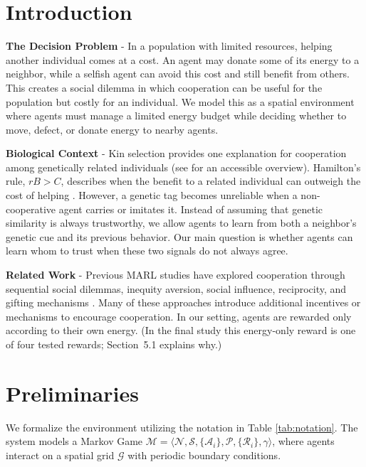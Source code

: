 \documentclass{article}
\begin{document}
\section{Introduction}

\textbf{The Decision Problem} - In a population with limited resources, helping another individual comes at a cost. An agent may donate some of its energy to a neighbor, while a selfish agent can avoid this cost and still benefit from others. This creates a social dilemma in which cooperation can be useful for the population but costly for an individual. We model this as a spatial environment where agents must manage a limited energy budget while deciding whether to move, defect, or donate energy to nearby agents.

\textbf{Biological Context} - Kin selection provides one explanation for cooperation among genetically related individuals (see \cite{veritasium2025} for an accessible overview). Hamilton's rule, $rB>C$, describes when the benefit to a related individual can outweigh the cost of helping \cite{hamilton1964}. However, a genetic tag becomes unreliable when a non-cooperative agent carries or imitates it. Instead of assuming that genetic similarity is always trustworthy, we allow agents to learn from both a neighbor's genetic cue and its previous behavior. Our main question is whether agents can learn whom to trust when these two signals do not always agree.

\textbf{Related Work} - Previous MARL studies have explored cooperation through sequential social dilemmas, inequity aversion, social influence, reciprocity, and gifting mechanisms \cite{leibo2017,hughes2018,jaques2019,eccles2019,lupu2020,perolat2017}. Many of these approaches introduce additional incentives or mechanisms to encourage cooperation. In our setting, agents are rewarded only according to their own energy. (In the final study this energy-only reward is one of four tested rewards; Section~5.1 explains why.)

\section{Preliminaries}

We formalize the environment utilizing the notation in Table \ref{tab:notation}. The system models a Markov Game $\mathcal{M} = \langle \mathcal{N}, \mathcal{S}, \{\mathcal{A}_i\}, \mathcal{P}, \{\mathcal{R}_i\}, \gamma \rangle$, where agents interact on a spatial grid $\mathcal{G}$ with periodic boundary conditions.
\end{document}
